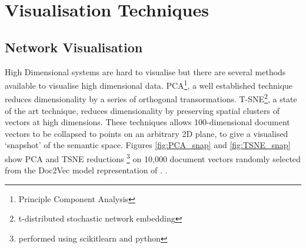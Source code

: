 \section{Visualisation Techniques}
\subsection{Network Visualisation}
High Dimensional systems are hard to visualise but there are several methods available to visualise high dimensional data. PCA\footnote{Principle Component Analysis}\cite{PCA}, a well established technique reduces dimensionality by a series of orthogonal transormations. T-SNE\footnote{t-distributed stochastic network embedding }, a state of the art technique, reduces dimensionality by preserving spatial clusters of vectors at high dimensions\cite{TSNE}. These techniques allows 100-dimensional document vectors to be collapsed to points on an arbitrary 2D plane, to give a visualised `snapshot' of the semantic space. 
Figures \ref{fig:PCA_snap} and \ref{fig:TSNE_snap} show PCA and TSNE reductions \footnote{performed using scikitlearn and python} on 10,000 document vectors randomly selected from the Doc2Vec model representation of . \cite{scikitlearn}.

